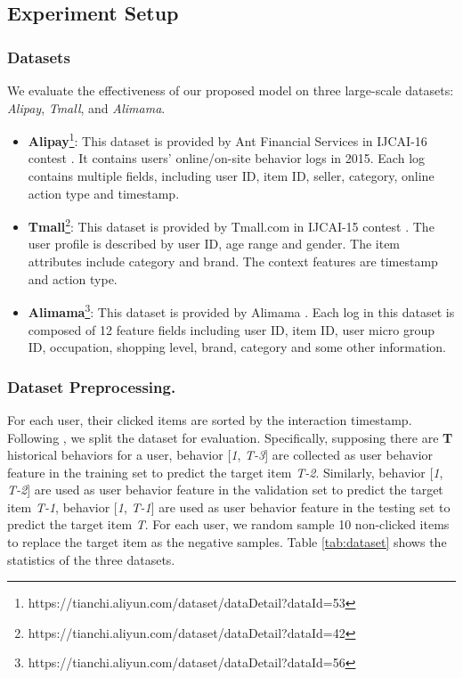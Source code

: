 \subsection{Experiment Setup}\label{ExperimentSetup}
\subsubsection{Datasets}
We evaluate the effectiveness of our proposed model on three large-scale datasets: \emph{Alipay}, \emph{Tmall}, and \emph{Alimama}.
\begin{itemize}
	\item \textbf{Alipay}\footnote{https://tianchi.aliyun.com/dataset/dataDetail?dataId=53}: 
	This dataset is provided by Ant Financial Services in IJCAI-16 contest \cite{qin2020user}.
	It contains users' online/on-site behavior logs in 2015.
	Each log contains multiple fields, including user ID, item ID, seller, category, online action type and timestamp.
	\item \textbf{Tmall}\footnote{https://tianchi.aliyun.com/dataset/dataDetail?dataId=42}: 
	This dataset is provided by Tmall.com in IJCAI-15 contest \cite{qin2020user}.
	The user profile is described by user ID, age range and gender. The item attributes include category and brand. The context features are timestamp and action type.
	\item \textbf{Alimama}\footnote{https://tianchi.aliyun.com/dataset/dataDetail?dataId=56}: 
	This dataset is provided by Alimama \cite{feng2019deep}.
	Each log in this dataset is composed of 12 feature fields including user ID, item ID, user micro group ID, occupation, shopping level, brand, category and some other information.
\end{itemize}
\subsubsection{Dataset Preprocessing.}
For each user, their clicked items are sorted by the interaction timestamp.
Following \cite{ren2019lifelong,qin2020user}, we split the dataset for evaluation.
Specifically, supposing there are \textbf{T} historical behaviors for a user, behavior [\textsl{1}, \textsl{T-3}] are collected as user behavior feature in the training set to predict the target item \textsl{T-2}. 
Similarly, behavior [\textsl{1}, \textsl{T-2}] are used as user behavior feature in the validation set to predict the target item \textsl{T-1}, behavior [\textsl{1}, \textsl{T-1}] are used as user behavior feature in the testing set to predict the target item \textsl{T}.
For each user, we random sample 10 non-clicked items to replace the target item as the negative samples.
Table \ref{tab:dataset} shows the statistics of the three datasets. 
 

